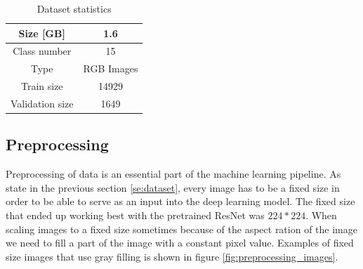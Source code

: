 \documentclass[times, utf8, diplomski]{fer}
\begin{document}
\begin{table}
\centering
\caption{Dataset statistics}
\label{tb:dataset_statistics}
\begin{tabular}{|c|c|}
\hline 
Size [GB] & 1.6 \\ \hline 
Class number & 15 \\ 
Type & RGB Images \\ 
Train size & 14929 \\
Validation size & 1649 \\
\hline 
\end{tabular} 
\end{table}

\subsection{Preprocessing}
Preprocessing of data is an essential part of the machine learning pipeline. As state in the previous section \ref{se:dataset}, every image has to be a fixed size in order to be able to serve as an input into the deep learning model. The fixed size that ended up working best with the pretrained ResNet was $224 * 224$. When scaling images to a fixed size sometimes because of the aspect ration of the image we need to fill a part of the image with a constant pixel value. Examples of fixed size images that use gray filling is shown in figure \ref{fig:preprocessing_images}.
\end{document}
